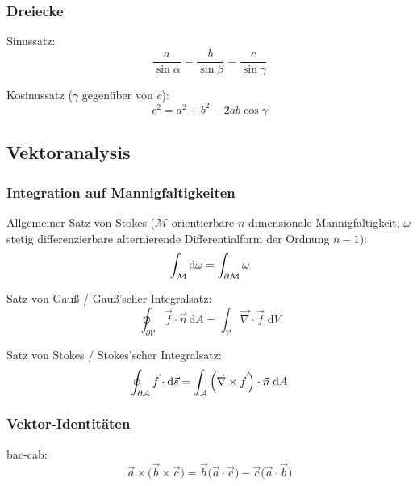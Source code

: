 \documentclass[11pt]{article}
\numberwithin{equation}{section}
\begin{document}
			\subsubsection{Dreiecke}
				\noindent
				Sinussatz:
				\begin{equation}
					\frac{a}{\sin\alpha} = \frac{b}{\sin\beta} = \frac{c}{\sin\gamma}
				\end{equation}

				\noindent
				Kosinussatz ($\gamma$ gegenüber von $c$):
				\begin{equation}
					c^2 = a^2 + b^2 -2ab \cos\gamma
				\end{equation}


		\subsection{Vektoranalysis}
			\subsubsection{Integration auf Mannigfaltigkeiten}
				\noindent
				Allgemeiner Satz von Stokes ($\mathcal{M}$ orientierbare $n$-dimensionale Mannigfaltigkeit, $\omega$ stetig differenzierbare alternierende Differentialform der Ordnung $n-1$):
				\begin{equation}
					\int_\mathcal{M} \mathrm{d} \omega = \int_{\partial\mathcal{M}} \omega
				\end{equation}

				\noindent
				Satz von Gauß / Gauß'scher Integralsatz:
				\begin{equation}
					\oint_{\partial\mathcal{V}}\vec{f}\cdot\vec{n}\,\mathrm{d}A=\int_{\mathcal{V}}\vec{\nabla}\cdot\vec{f}\;\mathrm{d}V
				\end{equation}

				\noindent
				Satz von Stokes / Stokes'scher Integralsatz:
				\begin{equation}
					\oint_{\partial\mathcal{A}}\vec{f}\cdot\mathrm{d}\vec{s}=\int_{\mathcal{A}}\left(\vec{\nabla}\times\pvec{f}\right)\cdot\vec{n}\;\mathrm{d}A
				\end{equation}

			\subsubsection{Vektor-Identitäten}
				\noindent
				bac-cab:
				\begin{equation}
					\vec{a}\times\big(\vec{b}\times\vec{c}\big) = \vec{b}\big(\vec{a}\cdot\vec{c}\big) - \vec{c}\big(\vec{a}\cdot\vec{b}\big)
				\end{equation}
\end{document}

